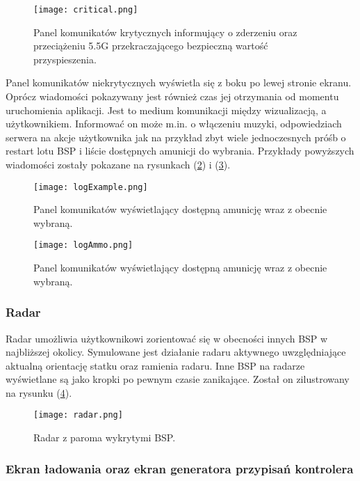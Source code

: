 \begin{figure}
	\centering
	\texttt{[image: critical.png]}
	\caption{Panel komunikatów krytycznych informujący o zderzeniu oraz przeciążeniu 5.5G przekraczającego bezpieczną wartość przyspieszenia.}
	\label{fig:critical}
\end{figure}

Panel komunikatów niekrytycznych wyświetla się z boku po lewej stronie ekranu. Oprócz wiadomości pokazywany jest również czas jej otrzymania od momentu uruchomienia aplikacji. Jest to medium komunikacji między wizualizacją, a użytkownikiem. Informować on może m.in. o włączeniu muzyki, odpowiedziach serwera na akcje użytkownika jak na przykład zbyt wiele jednoczesnych próśb o restart lotu BSP i liście dostępnych amunicji do wybrania. Przykłady powyższych wiadomości zostały pokazane na rysunkach (\ref{logExample}) i (\ref{logAmmo}).

\begin{figure}
	\centering
	\texttt{[image: logExample.png]}
	\caption{Panel komunikatów wyświetlający dostępną amunicję wraz z obecnie wybraną.}
	\label{logExample}
\end{figure}

\begin{figure}
	\centering
	\texttt{[image: logAmmo.png]}
	\caption{Panel komunikatów wyświetlający dostępną amunicję wraz z obecnie wybraną.}
	\label{logAmmo}
\end{figure}


\subsubsection{Radar}

Radar umożliwia użytkownikowi zorientować się w obecności innych BSP w najbliższej okolicy. Symulowane jest działanie radaru aktywnego uwzględniające aktualną orientację statku oraz ramienia radaru. Inne BSP na radarze wyświetlane są jako kropki po pewnym czasie zanikające. Został on zilustrowany na rysunku (\ref{radar}).


\begin{figure}[h]
	\centering
	\texttt{[image: radar.png]}
	\caption{Radar z paroma wykrytymi BSP.}
	\label{radar}
\end{figure}

\subsubsection{Ekran ładowania oraz ekran generatora przypisań kontrolera}
	
